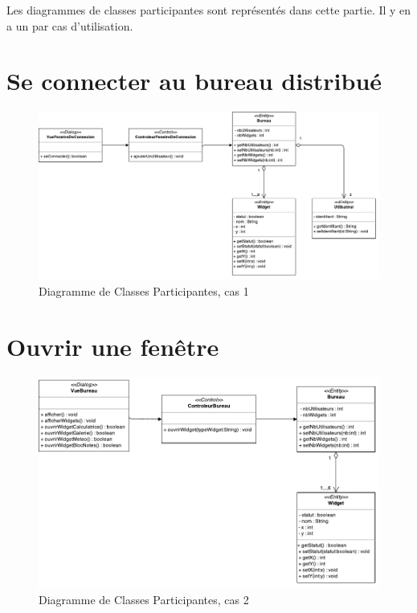 Les diagrammes de classes participantes sont représentés dans cette 
partie. Il y en a un par cas d'utilisation.

\section{Se connecter au bureau distribué}

\noindent\begin{figure}[H]
	\centering
	\includegraphics[angle=90,scale=0.8]{diagrammes/DCP1.pdf}
	\caption{Diagramme de Classes Participantes, cas 1}
\end{figure}

\section{Ouvrir une fenêtre}

\begin{figure}[H]
	\centering
	\includegraphics[angle=90]{diagrammes/DCP2.pdf}
	\caption{Diagramme de Classes Participantes, cas 2}
\end{figure}

